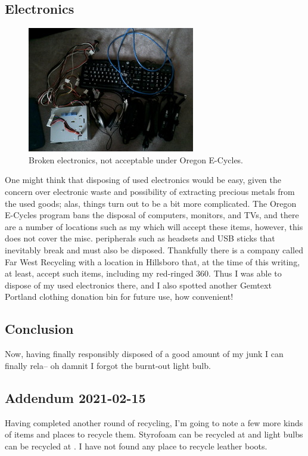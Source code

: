 \documentclass{article}
\begin{document}
\subsection{Electronics}
\begin{figure}
\includegraphics{files/blog/2018_03_15_recycling_in_hillsboro/2018_03_15_electronics.png}
\caption{Broken electronics, not acceptable under Oregon E-Cycles.}
\end{figure}
One might think that disposing of used electronics would be easy, given the concern over electronic waste and possibility of extracting precious metals from the used goods; alas, things turn out to be a bit more complicated.  The Oregon E-Cycles program bans the disposal of computers, monitors, and TVs, and there are a number of locations such as my  which will accept these items, however, this does not cover the misc. peripherals such as headsets and USB sticks that inevitably break and must also be disposed.  Thankfully there is a company called Far West Recycling with a location in Hillsboro that, at the time of this writing, at least,  accept such items, including my red-ringed 360.  Thus I was able to dispose of my used electronics there, and I also spotted another Gemtext Portland clothing donation bin for future use, how convenient!

\subsection{Conclusion}
Now, having finally responsibly disposed of a good amount of my junk I can finally rela-- oh damnit I forgot the burnt-out light bulb.

\subsection{Addendum 2021-02-15}
Having completed another round of recycling, I'm going to note a few more kinds of items and places to recycle them.  Styrofoam can be recycled at  and light bulbs can be recycled at .  I have not found any place to recycle leather boots.
\end{document}
